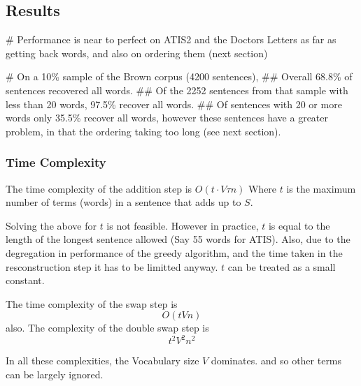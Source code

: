 \documentclass[]{scrartcl}
\numberwithin{equation}{section}
\numberwithin{figure}{section}
\theoremstyle{plain}
\theoremstyle{definition}
\begin{document}
\subsection{Results}
\begin{easylist}[itemize]
	# Performance is near to perfect on ATIS2 and the Doctors Letters as far as getting back words, and also on ordering them (next section)
	
	# On a 10\% sample of the Brown corpus (4200 sentences),
	## Overall 68.8\% of sentences recovered all words.
	## Of the 2252 sentences from that sample with less than 20 words, 97.5\% recover all words. 
	## Of sentences with 20 or more words only 35.5\% recover all words, however these sentences have a greater problem, in that the ordering taking too long (see next section).
\end{easylist}







\subsubsection{Time Complexity}
The time complexity of the addition step is $O(t \cdot V\tau n)$
Where $t$ is the maximum number of terms (words) in a sentence that adds up to $S$.

Solving the above for $t$ is not feasible. However in practice, $t$ is equal to the length of the longest sentence allowed (Say 55 words for ATIS). Also, due to the degregation in performance of the greedy algorithm, and the time taken in the resconstruction step it has to be limitted anyway. $t$ can be treated as a small constant.

The time complexity of the swap step is $$O(tVn)$$ also.
The complexity of the double swap step is $$t^2 V^2 n^2$$

In all these complexities, the Vocabulary size $V$ dominates. and so other terms can be largely ignored.
\end{document}
